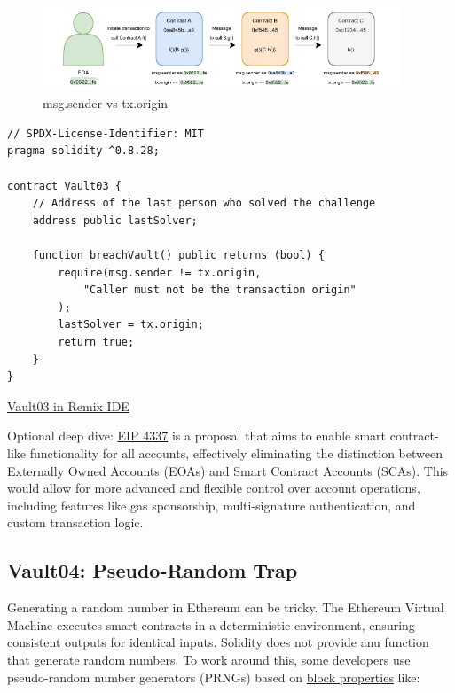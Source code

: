 \documentclass[12pt]{article}
\begin{document}
\begin{figure}[h!]
  \centering
  \includegraphics[width=0.95\textwidth]{msg.sender.pdf}
  \caption{msg.sender vs tx.origin}
  \label{fig:msg.sender}
\end{figure}

\begin{lstlisting}[language=Solidity]
// SPDX-License-Identifier: MIT
pragma solidity ^0.8.28;

contract Vault03 {
    // Address of the last person who solved the challenge
    address public lastSolver;

    function breachVault() public returns (bool) {
        require(msg.sender != tx.origin,
            "Caller must not be the transaction origin"
        );
        lastSolver = tx.origin;
        return true;
    }
}
\end{lstlisting}

\medskip
\noindent
\href{https://remix.ethereum.org/?#activate=solidity&url=https://github.com/radovluk/unbreakable-vault/contracts/Vault03.sol&lang=en&optimize=false&runs=200&evmVersion=null&version=soljson-v0.8.28+commit.7893614a.js}{Vault03 in Remix IDE}

\medskip
\noindent
Optional deep dive:
\href{https://eips.ethereum.org/EIPS/eip-4337}{EIP 4337} is a proposal that aims to enable smart contract-like functionality for all accounts, effectively eliminating the distinction between Externally Owned Accounts (EOAs) and Smart Contract Accounts (SCAs). This would allow for more advanced and flexible control over account operations, including features like gas sponsorship, multi-signature authentication, and custom transaction logic.

\subsection*{Vault04: Pseudo-Random Trap}

Generating a random number in Ethereum can be tricky. The Ethereum Virtual Machine executes smart contracts in a deterministic environment, ensuring consistent outputs for identical inputs. Solidity does not provide anu function that generate random numbers. To work around this, some developers use pseudo-random number generators (PRNGs) based on \href{https://docs.soliditylang.org/en/latest/cheatsheet.html\#block-and-transaction-properties}{block properties} like:
\end{document}
